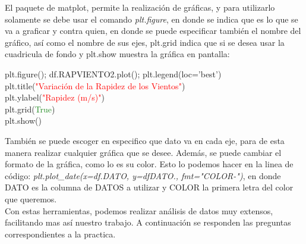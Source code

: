 \documentclass[12pt]{article}
\begin{document}
El paquete de matplot, permite la realización de gráficas, y para utilizarlo solamente se debe usar el comando \textit{plt.figure}, en donde se indica que es lo que se va a graficar y contra quien, en donde se puede especificar también el nombre del gráfico, así como el nombre de sus ejes, plt.grid indica que si se desea usar la cuadricula de fondo y plt.show muestra la gráfica en pantalla: 

\begin{center}
plt.figure(); df.RAPVIENTO2.plot(); plt.legend(loc='best') \\
plt.title(\textcolor{red}{"Variación de la Rapidez de los Vientos"})\\
plt.ylabel(\textcolor{red}{"Rapidez (m/s)"})\\
plt.grid(\textcolor{ForestGreen}{True})\\
plt.show()\\
\end{center}
También se puede escoger en especifico que dato va en cada eje, para de esta manera realizar cualquier gráfica que se desee. Además, se puede cambiar el formato de la gráfica, como lo es su color. Esto lo podemos hacer en la linea de código: \textit{plt.plot\_date(x=df.DATO, y=dfDATO., fmt="COLOR-")}, en donde DATO es la columna de DATOS a utilizar y COLOR la primera letra del color que queremos. \\
Con estas herramientas, podemos realizar análisis de datos muy extensos, facilitando mas así nuestro trabajo. A continuación se responden las preguntas correspondientes a la practica.
\end{document}

